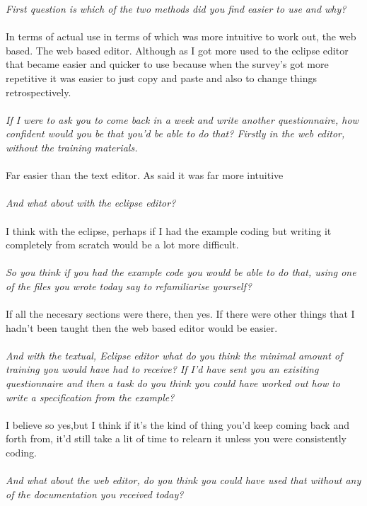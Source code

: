 \documentclass{report}
\begin{document}
\textit{First question is which of the two methods did you find easier to use and why?}
\\
\\
In terms of actual use in terms of which was more intuitive to work out, the web based. The web based editor. Although as I got more used to the eclipse editor that became easier and quicker to use because when the survey's got more repetitive it was easier to just copy and paste and also to change things retrospectively.
\\
\\
\textit{If I were to ask you to come back in a week and write another questionnaire, how confident would you be that you'd be able to do that? Firstly in the web editor, without the training materials.}
\\
\\
Far easier than the text editor. As said it was far more intuitive
\\
\\
\textit{And what about with the eclipse editor?}
\\
\\
I think with the eclipse, perhaps if I had the example coding but writing it completely from scratch would be a lot more difficult.
\\
\\
\textit{So you think if you had the example code you would be able to do that, using one of the files you wrote today say to refamiliarise yourself?}
\\
\\
If all the necesary sections were there, then yes. If there were other things that I hadn't been taught then the web based editor would be easier.
\\
\\
\textit{And with the textual, Eclipse editor what do you think the minimal amount of training you would have had to receive? If I'd have sent you an exisiting questionnaire and then a task do you think you could have worked out how to write a specification from the example?}
\\
\\
I believe so yes,but I think if it's the kind of thing you'd keep coming back and forth from, it'd still take a lit of time to relearn it unless you were consistently coding.
\\
\\
\textit{And what about the web editor, do you think you could have used that without any of the documentation you received today?}
\end{document}
